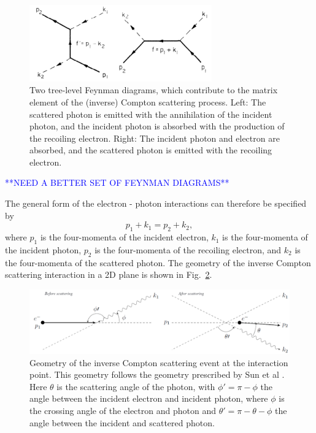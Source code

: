 \documentclass[../main.tex]{subfiles}
\begin{document}
\begin{figure}[!h]
\centering
\includegraphics[width=0.7\textwidth]{Figures/Photon_Production_by_Inverse_Compton_Scattering/Berestetskii_ICS_Feynman.pdf}
\caption{Two tree-level Feynman diagrams, which contribute to the matrix element of the (inverse) Compton scattering process. Left: The scattered photon is emitted with the annihilation of the incident photon, and the incident photon is absorbed with the production of the recoiling electron. Right: The incident photon and electron are absorbed, and the scattered photon is emitted with the recoiling electron. \cite{berestetskii1982quantum}}
\label{fig:ICS_Feynman_diagrams}
\end{figure}
\textcolor{blue}{**NEED A BETTER SET OF FEYNMAN DIAGRAMS**}

The general form of the electron - photon interactions can therefore be specified by
\begin{equation}
p_{1} + k_{1} = p_{2} + k_{2},
\label{eq:ICS_process}
\end{equation}
where $p_{1}$ is the four-momenta of the incident electron, $k_{1}$ is the four-momenta of the incident photon, $p_{2}$ is the four-momenta of the recoiling electron, and $k_{2}$ is the four-momenta of the scattered photon. The geometry of the inverse Compton scattering interaction in a 2D plane is shown in Fig.~\ref{fig:scattered_photon_kinematics}.

\begin{figure}[!h]
\centering
\includegraphics[width=\textwidth]{Figures/Photon_Production_by_Inverse_Compton_Scattering/scatteringkinematicsdiagram.pdf}
\caption{Geometry of the inverse Compton scattering event at the interaction point. This geometry follows the geometry prescribed by Sun et al \cite{sun2009energy}. Here $\theta$ is the scattering angle of the photon, with $\phi' = \pi -\phi$ the angle between the incident electron and incident photon, where $\phi$ is the crossing angle of the electron and photon and $\theta' = \pi - \theta - \phi$ the angle between the incident and scattered photon. }
\label{fig:scattered_photon_kinematics}
\end{figure}
\end{document}

